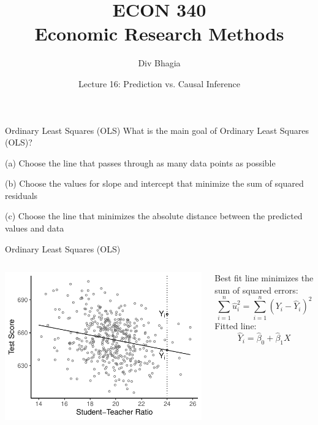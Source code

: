 \documentclass{./../div_teaching_slides}
\begin{document}
\title{ECON 340 \\ Economic Research Methods}
\author{Div Bhagia}
\date{Lecture 16: Prediction vs. Causal Inference}

\begin{frame}
\maketitle
\end{frame}


\begin{frame}{Ordinary Least Squares (OLS)}
What is the main goal of Ordinary Least Squares (OLS)? \\ \vspace{0.5em}
\begin{witemize}
  \item[(a)] Choose the line that passes through as many data points as possible
  \item[(b)] Choose the values for slope and intercept that minimize the sum of squared residuals
  \item[(c)] Choose the line that minimizes the absolute distance between the predicted values and data
  \end{witemize}
\end{frame}


\begin{frame}{Ordinary Least Squares (OLS)}
\begin{columns}[c]
\begin{column}{0.7\textwidth}
\includegraphics{./../../output/lrm_caschool_ols.pdf}
\end{column}
\begin{column}{0.35\textwidth}
Best fit line minimizes the sum of squared errors: $$\sum_{i=1}^n \hat{u}_i^2 =\sum_{i=1}^n(Y_i - \hat{Y}_i)^2$$
Fitted line:
$$ \hat{Y}_i = \hat{\beta}_0 + \hat{\beta}_1 X  $$
\vfill
\end{column}
\end{columns}
\end{frame}
\end{document}
